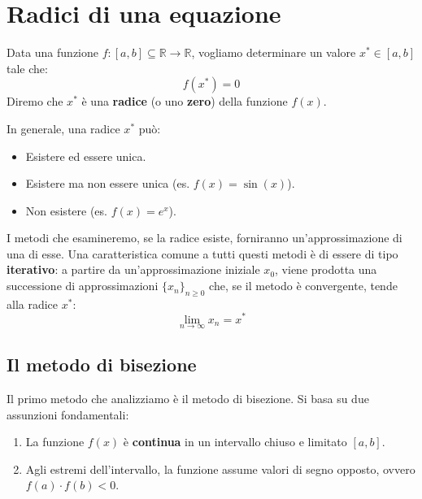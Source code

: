 \section{Radici di una equazione}

Data una funzione $f: [a,b] \subseteq \mathbb{R} \to \mathbb{R}$, vogliamo determinare un valore $x^* \in [a,b]$ tale che:
\[
f(x^*) = 0
\]
Diremo che $x^*$ è una \textbf{radice} (o uno \textbf{zero}) della funzione $f(x)$.

In generale, una radice $x^*$ può:
\begin{itemize}
    \item Esistere ed essere unica.
    \item Esistere ma non essere unica (es. $f(x) = \sin(x)$).
    \item Non esistere (es. $f(x) = e^x$).
\end{itemize}

I metodi che esamineremo, se la radice esiste, forniranno un'approssimazione di una di esse.  
Una caratteristica comune a tutti questi metodi è di essere di tipo \textbf{iterativo}:  
a partire da un'approssimazione iniziale $x_0$, viene prodotta una successione di approssimazioni $\{x_n\}_{n \ge 0}$ che, se il metodo è convergente, tende alla radice $x^*$:
\[
\lim_{n \to \infty} x_n = x^*
\]

\subsection{Il metodo di bisezione}
Il primo metodo che analizziamo è il metodo di bisezione.  
Si basa su due assunzioni fondamentali:
\begin{enumerate}
    \item La funzione $f(x)$ è \textbf{continua} in un intervallo chiuso e limitato $[a,b]$.
    \item Agli estremi dell'intervallo, la funzione assume valori di segno opposto, ovvero $f(a) \cdot f(b) < 0$.
\end{enumerate}

